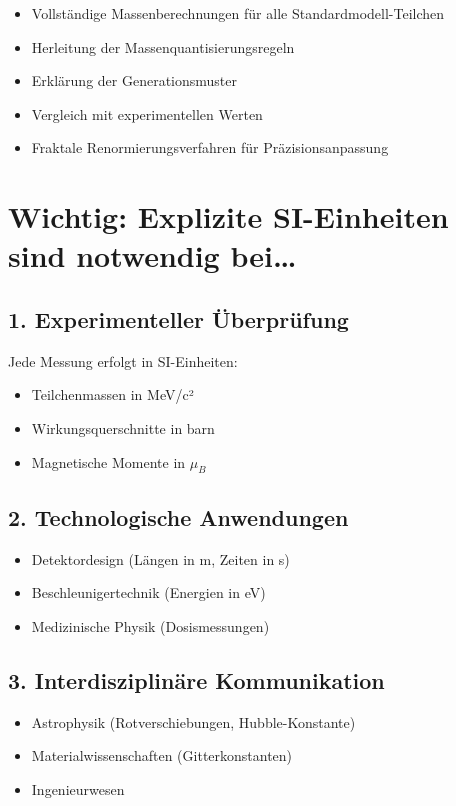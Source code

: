 \documentclass[12pt,a4paper]{article}
\begin{document}
	\begin{itemize}
		\item Vollständige Massenberechnungen für alle Standardmodell-Teilchen
		\item Herleitung der Massenquantisierungsregeln
		\item Erklärung der Generationsmuster
		\item Vergleich mit experimentellen Werten
		\item Fraktale Renormierungsverfahren für Präzisionsanpassung
	\end{itemize}
	
	\section{Wichtig: Explizite SI-Einheiten sind notwendig bei\dots}
	\label{sec:si-notwendig}
	
	\subsection{1. Experimenteller Überprüfung}
	Jede Messung erfolgt in SI-Einheiten:
	\begin{itemize}
		\item Teilchenmassen in MeV/c²
		\item Wirkungsquerschnitte in barn
		\item Magnetische Momente in $\mu_B$
	\end{itemize}
	
	\subsection{2. Technologische Anwendungen}
	\begin{itemize}
		\item Detektordesign (Längen in m, Zeiten in s)
		\item Beschleunigertechnik (Energien in eV)
		\item Medizinische Physik (Dosismessungen)
	\end{itemize}
	
	\subsection{3. Interdisziplinäre Kommunikation}
	\begin{itemize}
		\item Astrophysik (Rotverschiebungen, Hubble-Konstante)
		\item Materialwissenschaften (Gitterkonstanten)
		\item Ingenieurwesen
	\end{itemize}
	
\end{document}
